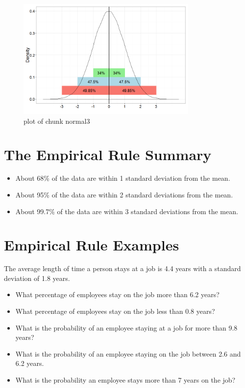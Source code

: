 \documentclass[12pt]{article}
\begin{document}
\begin{figure}[H]
\centering
\includegraphics[width=3.5in]{figure/normal3-1.png}
\caption{plot of chunk normal3}
\end{figure}

\section{The Empirical Rule Summary}\label{the-empirical-rule-summary}

\begin{itemize}
\itemsep1pt\parskip0pt
\item
  About 68\% of the data are within 1 standard deviation from the mean.
\item
  About 95\% of the data are within 2 standard deviations from the mean.
\item
  About 99.7\% of the data are within 3 standard deviations from the
  mean.
\end{itemize}

\section{Empirical Rule Examples}\label{empirical-rule-examples}

The average length of time a person stays at a job is 4.4 years with a
standard deviation of 1.8 years.

\begin{itemize}
\itemsep1pt\parskip0pt
\item
  What percentage of employees stay on the job more than 6.2 years?
\item
  What percentage of employees stay on the job less than 0.8 years?
\item
  What is the probability of an employee staying at a job for more than
  9.8 years?
\item
  What is the probability of an employee staying on the job between 2.6
  and 6.2 years.
\item
  What is the probability an employee stays more than 7 years on the
  job?
\end{itemize}
\end{document}
